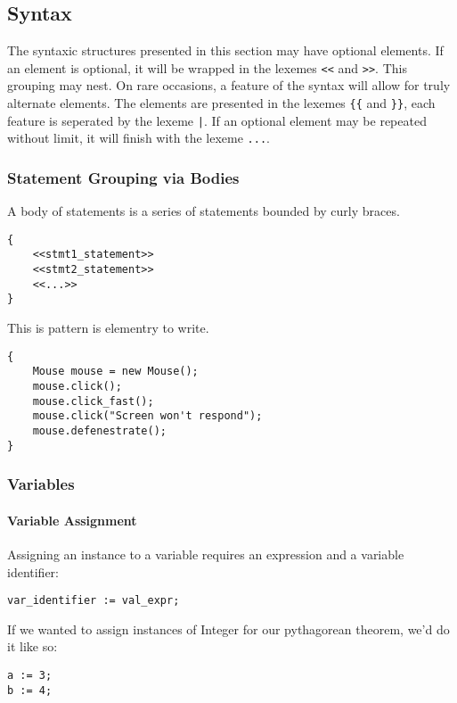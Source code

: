 \subsection{Syntax}
The syntaxic structures presented in this section may have optional elements. If an element is optional, it will be wrapped in the lexemes \verb!<<! and \verb!>>!. This grouping may nest. On rare occasions, a feature of the syntax will allow for truly alternate elements. The elements are presented in the lexemes \verb!{{! and \verb!}}!, each feature is seperated by the lexeme \verb!|!. If an optional element may be repeated without limit, it will finish with the lexeme \verb!...!.
\subsubsection{Statement Grouping via Bodies}
A body of statements is a series of statements bounded by curly braces.

\begin{lstlisting}
{
	<<stmt1_statement>>
	<<stmt2_statement>>
	<<...>>
}
\end{lstlisting}

This is pattern is elementry to write.

\begin{lstlisting}[caption=Statement Grouping of a Typical Interface Simulator,backgroundcolor=\color{tintedorange}]
{
	Mouse mouse = new Mouse();
	mouse.click();
	mouse.click_fast();
	mouse.click("Screen won't respond");
	mouse.defenestrate();
}
\end{lstlisting}

\subsubsection{Variables}
\paragraph{Variable Assignment}
Assigning an instance to a variable requires an expression and a variable identifier:

\begin{lstlisting}
var_identifier := val_expr;
\end{lstlisting}

If we wanted to assign instances of Integer for our pythagorean theorem, we'd do it like so:

\begin{lstlisting}[caption=Variable Assignment for the Pythagorean Theorem,backgroundcolor=\color{tintedorange}]
a := 3;
b := 4;
\end{lstlisting}

